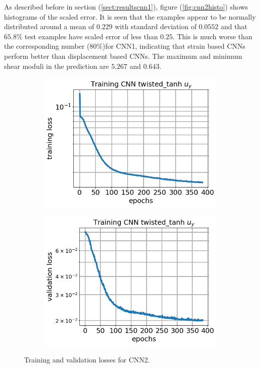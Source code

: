 \documentclass[12pt]{article}
\newcommand{\nhghalfwidth}{0.48\linewidth}
\newcommand{\nhgtotalheight}{4cm}
\begin{document}
As described before in section (\ref{sect:resultscnn1}), figure (\ref{fig:cnn2histo}) shows histograms of the scaled error. It is seen that the examples appear to be normally distributed around a mean of ${0.229}$ with standard deviation of $0.0552$ and that $65.8\%$ test examples have scaled error of less than $0.25$. This is much worse than the corresponding number ($80\%$)for CNN1, indicating that strain based CNNs perform better than displacement based CNNs. The maximum and minimum shear moduli in the prediction are $5.267$ and $0.643$. 
\begin{figure}[!h]
  \centering
  \begin{subfigure}[c]{\nhghalfwidth}
    \centering
    \includegraphics[totalheight=\nhgtotalheight]{Figures/Results2/loss.png}
  \end{subfigure}
%  
  \begin{subfigure}[c]{\nhghalfwidth}
    \centering
    \includegraphics[totalheight=\nhgtotalheight]{Figures/Results2/val_loss.png}
  \end{subfigure}
  \caption{\label{fig:cnn2losses} Training and validation losses for CNN2.}
\end{figure}
\end{document}
